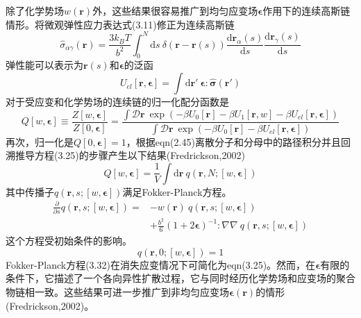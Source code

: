除了化学势场$w(\mathbf{r})$外，这些结果很容易推广到均匀应变场$\boldsymbol{\epsilon}$作用下的连续高斯链情形。将微观弹性应力表达式(3.11)修正为连续高斯链
\begin{equation}
\hat{\sigma}_{\alpha\gamma}(\mathbf{r})=\frac{3k_BT}{b^2}\int_0^N\mathrm{d}s~\delta(\mathbf{r}-\mathbf{r}(s))\frac{\mathrm{d}\mathbf{r}_{\alpha}(s)}{\mathrm{d}s}\frac{\mathrm{d}\mathbf{r}_{\gamma}(s)}{\mathrm{d}s}
\end{equation}
弹性能可以表示为$\mathbf{r}(s)$和$\boldsymbol{\epsilon}$的泛函
\begin{equation}
U_{el}[\mathbf{r},\boldsymbol{\epsilon}]=\int\mathrm{d}\mathbf{r}'~\boldsymbol{\epsilon}:\hat{\boldsymbol{\sigma}}(\mathbf{r}')
\end{equation}
对于受应变和化学势场的连续链的归一化配分函数是
\begin{equation}
Q[w,\boldsymbol{\epsilon}]\equiv\frac{Z[w,\boldsymbol{\epsilon}]}{Z[0,\boldsymbol{\epsilon}]}=\frac{\int\mathcal{D}\mathbf{r}~\exp(-\beta U_0[\mathbf{r}]-\beta U_1[\mathbf{r},w]-\beta U_{el}[\mathbf{r},\boldsymbol{\epsilon}])}{\int\mathcal{D}\mathbf{r}~\exp(-\beta U_0[\mathbf{r}]-\beta U_{el}[\mathbf{r},\boldsymbol{\epsilon}])}
\end{equation}
再次，归一化是$Q[0,\boldsymbol{\epsilon}]=1$，根据eqn(2.45)离散分子和分母中的路径积分并且回溯推导方程(3.25)的步骤产生以下结果(Fredrickson,2002)
\begin{equation}
Q[w,\boldsymbol{\epsilon}]=\frac{1}{V}\int\mathrm{d}\mathbf{r}~q(\mathbf{r},N;[w,\boldsymbol{\epsilon}])
\end{equation}
其中传播子$q(\mathbf{r},s;[w,\boldsymbol{\epsilon}])$满足Fokker-Planck方程。
\begin{equation}
\begin{aligned}
\frac{\partial}{\partial s}q(\mathbf{r},s;[w,\boldsymbol{\epsilon}])=&-w(\mathbf{r})~q(\mathbf{r},s;[w,\boldsymbol{\epsilon}])\\
&+\frac{b^2}{6}(1+2\boldsymbol{\epsilon})^{-1}:\nabla\nabla~q(\mathbf{r},s;[w,\boldsymbol{\epsilon}])
\end{aligned}
\end{equation}
这个方程受初始条件的影响。
\begin{equation}
q(\mathbf{r},0;[w,\boldsymbol{\epsilon}])=1
\end{equation}
Fokker-Planck方程(3.32)在消失应变情况下可简化为eqn(3.25)。然而，在$\boldsymbol{\epsilon}$有限的条件下，它描述了一个各向异性扩散过程，它与同时经历化学势场和应变场的聚合物链相一致。这些结果可进一步推广到非均匀应变场$\boldsymbol{\epsilon}(\mathbf{r})$的情形(Fredrickson,2002)。
